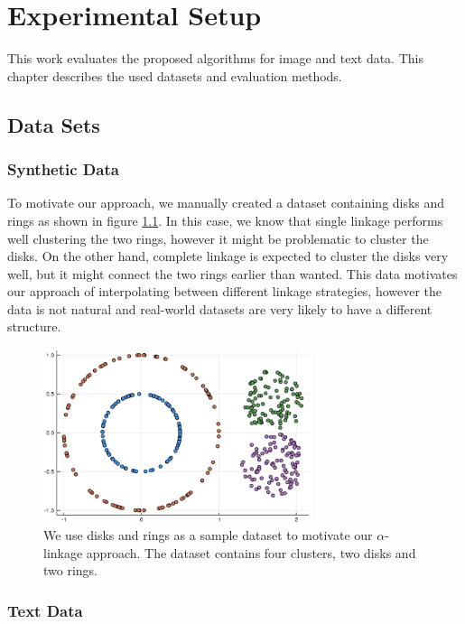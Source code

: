 \chapter{Experimental Setup}
\label{chapter:setup}

This work evaluates the proposed algorithms for image and text data. This chapter describes the used datasets and evaluation methods.

\section{Data Sets}
\label{chapter:datasets}

\subsection{Synthetic Data}

To motivate our approach, we manually created a dataset containing disks and rings as shown in figure \ref{fig:disksrings}. In this case, we know that single linkage performs well clustering the two rings, however it might be problematic to cluster the disks. On the other hand, complete linkage is expected to cluster the disks very well, but it might connect the two rings earlier than wanted. This data motivates our approach of interpolating between different linkage strategies, however the data is not natural and real-world datasets are very likely to have a different structure. 

\begin{figure}[h]
    \centering
    \includegraphics[width=0.7\textwidth]{images/RingsDisks}
    \caption{We use disks and rings as a sample dataset to motivate our $\alpha$-linkage approach. The dataset contains four clusters, two disks and two rings.}
    \label{fig:disksrings}
\end{figure}

\subsection{Text Data}

